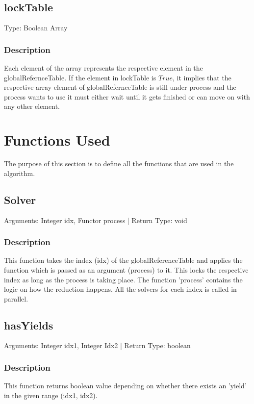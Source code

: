\documentclass{article}
\begin{document}
\begin{flushleft}
\subsection{lockTable}

Type: Boolean Array

\subsubsection*{Description}
 Each element of the array represents the respective element in the 
globalRefernceTable. If the element in lockTable is $True$, it implies that the respective
array element of globalRefernceTable is still under process and the process wants to use it must either wait until it gets finished or can move on with any other element.

\newpage

\section{Functions Used}

The purpose of this section is to define all the functions that are used in the algorithm.

\subsection{Solver}

Arguments: Integer idx, Functor process | Return Type: void

\subsubsection*{Description}
This function takes the index (idx) of the globalReferenceTable and applies the function which is passed as an argument (process) to it. This locks the respective index as long as the process is taking place. The function 'process' contains the logic on how the reduction happens. All the solvers for each index is called in parallel.


\subsection{hasYields}

Arguments: Integer idx1, Integer Idx2 | Return Type: boolean

\subsubsection*{Description}
This function returns boolean value depending on whether there exists an 'yield' in the given range (idx1, idx2).



\end{flushleft}
\end{document}
